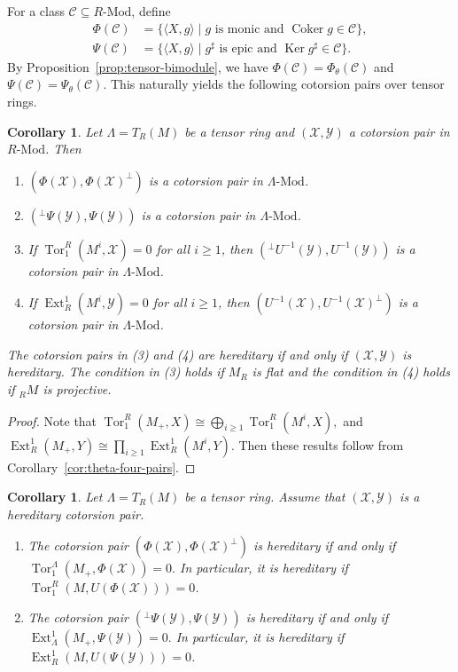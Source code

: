 \documentclass[11pt,reqno]{amsart}
\numberwithin{equation}{section}
\newtheorem{corollary}[theorem]{Corollary}
\newcommand{\cX}{\mathcal X}
\newcommand{\cY}{\mathcal Y}
\newcommand{\cC}{\mathcal C}
\newcommand{\Ext}{\operatorname{Ext}}
\newcommand{\Tor}{\operatorname{Tor}}
\newcommand{\Coker}{\operatorname{Coker}}
\newcommand{\Ker}{\operatorname{Ker}}
\begin{document}
For a class $\cC\subseteq R\text{-Mod}$, define
\begin{align*}
\Phi(\cC)
&=\{\langle X,g\rangle\mid g\text{ is monic and }\Coker g\in\cC\},\\
\Psi(\cC)
&=\{\langle X,g\rangle\mid g^\sharp\text{ is epic and }\Ker g^\sharp\in\cC\}.
\end{align*}
By Proposition~\ref{prop:tensor-bimodule}, we have $\Phi(\cC)=\Phi_\theta(\cC)$ and $\Psi(\cC)=\Psi_\theta(\cC)$. This naturally yields the following cotorsion pairs over tensor rings.





\begin{corollary}\label{thm:tensor-four-pairs}
Let $\Lambda=T_R(M)$ be a tensor ring and $(\cX,\cY)$ a cotorsion pair in $R\text{-Mod}$. Then %
\begin{enumerate}[label=\textup{(\arabic*)}]
\item $(\Phi(\cX),\Phi(\cX)^\perp)$ is a cotorsion pair in $\Lambda\text{-Mod}$.
\item $({}^\perp\Psi(\cY),\Psi(\cY))$ is a cotorsion pair in $\Lambda\text{-Mod}$.
\item If
$
\Tor_1^R(M^i,\cX)=0$ for all $i\ge 1$,
then $({}^\perp U^{-1}(\cY),U^{-1}(\cY))$ is a cotorsion pair in $\Lambda\text{-Mod}$.
\item If
$
\Ext_R^1(M^i,\cY)=0$ for all $i\ge 1$,
then $(U^{-1}(\cX),U^{-1}(\cX)^\perp)$ is a cotorsion pair in $\Lambda\text{-Mod}$.
\end{enumerate}
The cotorsion pairs in \textup{(3)} and \textup{(4)} are hereditary if and only if $(\cX,\cY)$ is hereditary. The condition in \textup{(3)} holds if $M_R$ is flat and the condition in \textup{(4)} holds if ${}_RM$ is projective.
\end{corollary}

\begin{proof}
Note that $\Tor_1^R(M_+,X)
\cong\bigoplus_{i\ge1}\Tor_1^R(M^i,X),
$ and $
\Ext_R^1(M_+,Y)
\cong\prod_{i\ge1}\Ext_R^1(M^i,Y)
$. Then these results follow from Corollary~\ref{cor:theta-four-pairs}.
\end{proof}

\begin{corollary}\label{cor:tensor-heredity}
Let $\Lambda=T_R(M)$ be a tensor ring. Assume that $(\cX,\cY)$ is a hereditary cotorsion pair.
\begin{enumerate}[label=\textup{(\arabic*)}]
\item The cotorsion pair $(\Phi(\cX),\Phi(\cX)^\perp)$ is hereditary if and only if
$
\Tor_1^\Lambda(M_+,\Phi(\cX))=0.
$
In particular, it is hereditary if $\Tor_1^R(M,U(\Phi(\cX)))=0$.
\item The cotorsion pair $({}^\perp\Psi(\cY),\Psi(\cY))$ is hereditary if and only if
$
\Ext_\Lambda^1(M_+,\Psi(\cY))=0.
$
In particular, it is hereditary if $\Ext^1_R(M,U(\Psi(\cY)))=0$.
\end{enumerate}
\end{corollary}
\end{document}
